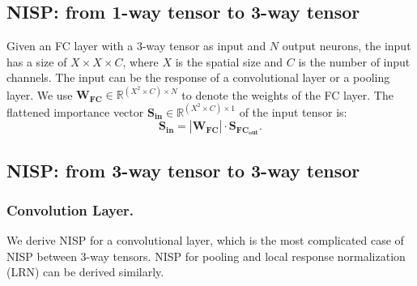 \documentclass[10pt,twocolumn,letterpaper]{article}
\begin{document}
\subsection{NISP: from 1-way tensor to 3-way tensor}
Given an FC layer with a 3-way tensor as input and $N$ output neurons, the input has a size of $X \times X \times C$, where $X$ is the spatial size and $C$ is the number of input channels. The input can be the response of a convolutional layer or a pooling layer.
We use $\mathbf{W_{FC}}\in \mathbb{R}^{(X^2 \times C)\times N}$ to denote the weights of the FC layer. The flattened importance vector $\mathbf{S_{in}} \in \mathbb{R}^ {(X^2 \times C)\times 1}$ of the input tensor is:
\begin{equation}
\label{RI_FC_conv}
\mathbf{S_{in}}=|\mathbf{W_{FC}}| \cdot \mathbf{S_{FC_{out}}}.
\end{equation}\subsection{NISP: from 3-way tensor to 3-way tensor}\subsubsection{Convolution Layer.}%
We derive NISP for a convolutional layer, which is the most complicated case of NISP between 3-way tensors.
NISP for pooling and local response normalization (LRN) can be derived similarly.
\end{document}
